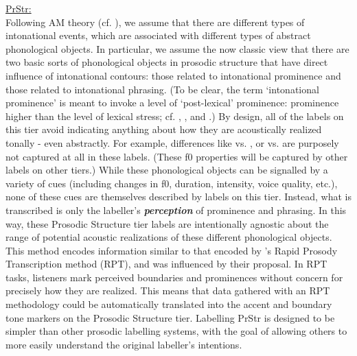 \uline{PrStr:}\\ Following AM theory (cf. \citealt{pierrehumbert80}), we assume that there are different types of intonational events, which are associated with different types of abstract phonological objects. In particular, we assume the now classic view that there are two basic sorts of phonological objects in prosodic structure that have direct influence of intonational contours: those related to intonational prominence and those related to intonational phrasing. (To be clear, the term ‘intonational prominence’ is meant to invoke a level of ‘post-lexical’ prominence: prominence higher than the level of lexical stress; cf. \citealt{bolinger58}, \citealt{libermanprince77}, and \citealt{beckmanedwards94}.) By design, all of the labels on this tier avoid indicating anything about how they are acoustically realized tonally - even abstractly. For example, differences like  vs. , or  vs.  are purposely not captured at all in these labels. (These f0 properties will be captured by other labels on other tiers.) While these phonological objects can be signalled by a variety of cues (including changes in f0, duration, intensity, voice quality, etc.), none of these cues are themselves described by labels on this tier. Instead, what is transcribed is only the labeller’s \textit{\textbf{perception}} of prominence and phrasing. In this way, these Prosodic Structure tier labels are intentionally agnostic about the range of potential acoustic realizations of these different phonological objects. This method encodes information similar to that encoded by \citeauthor{cole-14}’s \citeyear{cole-14} Rapid Prosody Transcription method (RPT), and was influenced by their proposal. In RPT tasks, listeners mark perceived boundaries and prominences without concern for precisely how they are realized. This means that data gathered with an RPT methodology could be automatically translated into the accent and boundary tone markers on the Prosodic Structure tier. Labelling PrStr is designed to be simpler than other prosodic labelling systems, with the goal of allowing others to more easily understand the original labeller’s intentions.

